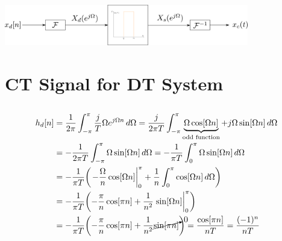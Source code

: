 \documentclass{article}
\begin{document}
\subsection{}

\begin{center}
    \includegraphics[width=0.8\textwidth]{q2-3.png}
\end{center}

\section{CT Signal for DT System}

\subsection{}

\begin{align}
    h_d[n] &= \frac{1}{2\pi} \int_{-\pi}^\pi \frac{j}{T} \Omega e^{j \Omega n} \, d\Omega = \frac{j}{2\pi T} \int_{-\pi}^\pi \underbrace{\Omega \cos[\Omega n]}_{\text{odd function}} + j\Omega \sin[\Omega n] \, d\Omega \\
    &= -\frac{1}{2 \pi T} \int_{-\pi}^\pi \Omega \sin[\Omega n] \, d\Omega = -\frac{1}{\pi T} \int_0^\pi \Omega \sin[\Omega n] \, d\Omega \\
    &= -\frac{1}{\pi T} \qty(\eval{-\frac{\Omega}{n} \cos[\Omega n]}_0^\pi + \frac{1}{n} \int_0^\pi \cos[\Omega n] \, d\Omega) \\
    &= -\frac{1}{\pi T} \qty(-\frac{\pi}{n} \cos[\pi n] + \frac{1}{n^2} \eval{\sin[\Omega n]}_0^\pi) \\
    &= -\frac{1}{\pi T} \qty(-\frac{\pi}{n} \cos[\pi n] + \frac{1}{n^2} \cancelto{0}{\sin[\pi n]}) = \frac{\cos[\pi n]}{nT} = \frac{(-1)^n}{nT}
\end{align}

\subsection{}
\end{document}
